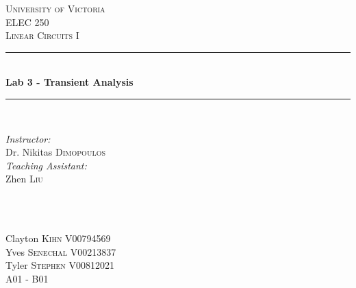 \documentclass[12pt]{article}
\newcommand{\HRule}{\rule{\linewidth}{0.5mm}}
\begin{document}

\begin{titlepage}

\center
 
\textsc{\LARGE University of Victoria}\\[1cm] 	%
\textsc{\Large ELEC 250}\\[0.5cm] 			%
\textsc{\large Linear Circuits I}\\[0.5cm] 		%


\HRule \\[0.4cm]
{ \huge \bfseries Lab 3 - Transient Analysis}\\[0.2cm] %
\HRule \\[1.5cm]
 
 
\begin{minipage}{0.7\textwidth}
\begin{flushleft} 

\large\emph{Instructor:} \\
Dr. Nikitas \textsc{Dimopoulos} \\
\vspace{12 pt}
\emph{Teaching Assistant:} \\
Zhen \textsc{Liu}

\end{flushleft}
\end{minipage}
~
\begin{minipage}{0.1\textwidth}
\begin{flushright} \large
\vspace{12 pt}
\end{flushright}
\end{minipage}\\[2cm]


\Large Clayton \textsc{Kihn}
\large V00794569	\\
\Large Yves \textsc{Senechal}
\large V00213837	\\
\Large Tyler \textsc{Stephen}
\large V00812021	\\
A01 - B01\\[1.5cm] 



\end{titlepage}
\end{document}
